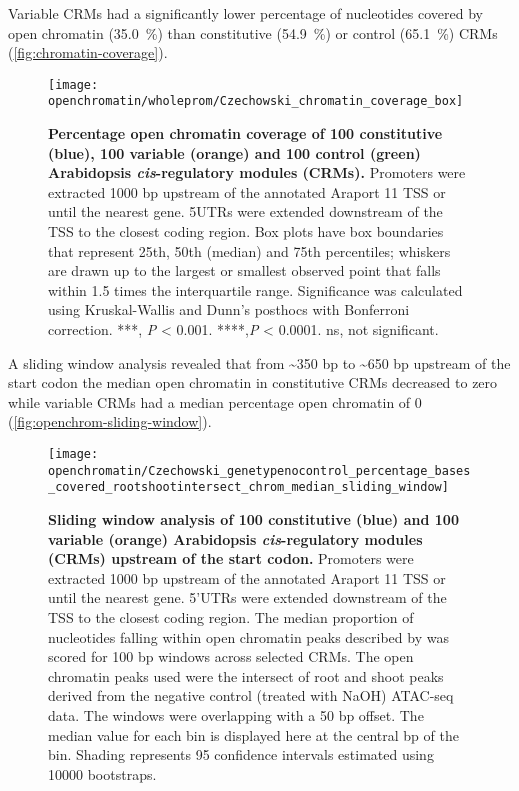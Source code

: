 \documentclass[../main.tex]{subfiles}
\begin{document}
Variable CRMs had a significantly lower percentage of nucleotides covered by open chromatin (\SI{35.0}{\percent}) than constitutive (\SI{54.9}{\percent}) or control (\SI{65.1}{\percent}) CRMs (\autoref{fig:chromatin-coverage}).

\begin{figure}[hbt!]
	\begin{center}
		\capstart
		\texttt{[image: openchromatin/wholeprom/Czechowski\_chromatin\_coverage\_box]}
		\caption{
			\textbf{Percentage open chromatin coverage of 100 constitutive (blue), 100 variable (orange) and 100 control (green) Arabidopsis \textit{cis}\hyp{}regulatory modules (CRMs).}
			Promoters were extracted 1000 bp upstream of the annotated Araport 11 \autocite{chengAraport11CompleteReannotation2017} TSS or until the nearest gene.
			5UTRs were extended downstream of the TSS to the closest coding region.
			Box plots have box boundaries that represent 25th, 50th (median) and 75th percentiles; whiskers are drawn up to the largest or smallest observed point that falls within 1.5 times the interquartile range.
			Significance was calculated using Kruskal\hyp{}Wallis and Dunn's posthocs with Bonferroni correction.
			***, \textit{P} \textless{} 0.001. ****,\textit{P} \textless{} 0.0001. ns, not significant.
			\label{fig:chromatin-coverage}
		}
	\end{center}
\end{figure}
A sliding window analysis revealed that from \textasciitilde{}350 bp to \textasciitilde{}650 bp upstream of the start codon the median open chromatin in constitutive CRMs decreased to zero while variable CRMs had a median percentage open chromatin of 0 (\autoref{fig:openchrom-sliding-window}).

\begin{figure}[!hbt]
	\begin{center}
		\capstart
		\texttt{[image: openchromatin/Czechowski\_genetypenocontrol\_percentage\_bases\_covered\_rootshootintersect\_chrom\_median\_sliding\_window]}
		\caption{
			\textbf{Sliding window analysis of 100 constitutive (blue) and 100 variable (orange) Arabidopsis \textit{cis}\hyp{}regulatory modules (CRMs) upstream of the start codon.}
			Promoters were extracted 1000 bp upstream of the annotated Araport 11 \autocite{chengAraport11CompleteReannotation2017} TSS or until the nearest gene.
			5'UTRs were extended downstream of the TSS to the closest coding region.
			The median proportion of nucleotides falling within open chromatin peaks described by \textcite{potterCytokininModulatesContextdependent2018} was scored for 100 bp windows across selected CRMs.
			The open chromatin peaks used were the intersect of root and shoot peaks derived from the negative control (treated with NaOH) ATAC\hyp{}seq data.
			The windows were overlapping with a 50 bp offset.
			The median value for each bin is displayed here at the central bp of the bin.
			Shading represents 95 confidence intervals estimated using 10000 bootstraps.		
			\label{fig:openchrom-sliding-window}
		}
	\end{center}
\end{figure}
\end{document}
